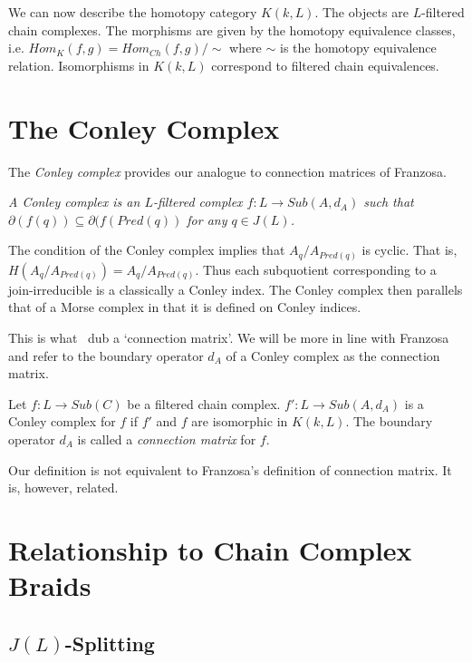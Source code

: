 We can now describe the homotopy category $K(k,L)$.  The objects are $L$-filtered chain complexes.  The morphisms are given by the homotopy equivalence classes, i.e. $Hom_K(f,g) = Hom_{Ch}(f,g)/\sim$ where $\sim$ is the homotopy equivalence relation.   Isomorphisms in $K(k,L)$ correspond to filtered chain equivalences.




\section{The Conley Complex}


The {\em Conley complex} provides our analogue to connection matrices of Franzosa.  

\begin{defn}
{\em A Conley complex is an $L$-filtered complex $f:L\to Sub(A,d_A)$ such that $\partial(f(q))\subseteq \partial(f(Pred(q))$ for any $q\in J(L)$.
}
\end{defn}

The condition of the Conley complex implies that $A_q/A_{Pred(q)}$ is cyclic.  That is, $H(A_q/A_{Pred(q)}) = A_q/A_{Pred(q)}$.  Thus each subquotient corresponding to a join-irreducible is a classically a Conley index.  The Conley complex then parallels that of a Morse complex in that it is defined on Conley indices.

\begin{rem}
This is what~\cite{salamon} dub a `connection matrix'.  We will be more in line with Franzosa and refer to the boundary operator $d_A$ of a Conley complex as the connection matrix.
\end{rem}

Let $f:L\to Sub(C)$ be a filtered chain complex.  $f':L\to Sub(A,d_A)$ is a Conley complex for $f$ if $f'$ and $f$ are isomorphic in $K(k,L)$.  The boundary operator $d_A$ is called a {\em connection matrix} for $f$.  

Our definition is not equivalent to Franzosa's definition of connection matrix.  It is, however, related.  



\section{Relationship to Chain Complex Braids}

\subsection{$J(L)$-Splitting}

